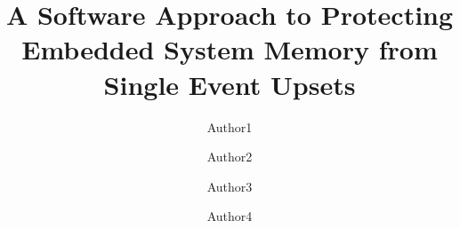 \documentclass[runningheads,a4paper]{llncs}
\begin{document}
\mainmatter  %

\date{}

\title{\Large \bf A Software Approach to Protecting Embedded System Memory from Single Event Upsets}


%
%

\vspace{-40pt}

\author{Author1%
\and Author2\and Author3\and Author4}
%
\authorrunning{}

\vspace{-40pt}


%
%

\toctitle{}
\tocauthor{}
\maketitle

\vspace{-30pt}










{\footnotesize 
	}
\end{document}
